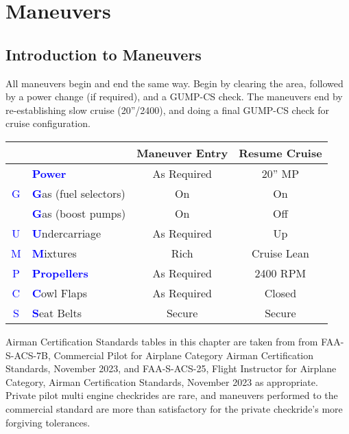 
\chapter{Maneuvers}

\section{Introduction to Maneuvers}

All maneuvers begin and end the same way. Begin by clearing the area, followed by a power change (if required),
and a GUMP-CS check. The maneuvers end by re-establishing slow cruise (20''/2400), and doing a final GUMP-CS
check for cruise configuration.

\begin{table}[H]
\centering
\begin{tabular}{|c|l|c|c|}
\hline
                    &                                                 & \textbf{Maneuver Entry} & \textbf{Resume Cruise} \\ \hline
                    & \textcolor{blue}{\textbf{Power}}                & As Required             & 20'' MP                \\ \hline
\textcolor{blue}{G} & \textcolor{blue}{\textbf{G}}as (fuel selectors) & On                      & On                     \\
                    & \textcolor{blue}{\textbf{G}}as (boost pumps)    & On                      & Off                    \\ \hline
\textcolor{blue}{U} & \textcolor{blue}{\textbf{U}}ndercarriage        & As Required             & Up                     \\ \hline
\textcolor{blue}{M} & \textcolor{blue}{\textbf{M}}ixtures             & Rich                    & Cruise Lean            \\ \hline
\textcolor{blue}{P} & \textcolor{blue}{\textbf{Propellers}}           & As Required             & 2400 RPM               \\ \hline
\textcolor{blue}{C} & \textcolor{blue}{\textbf{C}}owl Flaps           & As Required             & Closed                 \\ \hline
\textcolor{blue}{S} & \textcolor{blue}{\textbf{S}}eat Belts           & Secure                  & Secure                 \\ \hline
\end{tabular}
\end{table}

Airman Certification Standards tables in this chapter are taken from from FAA-S-ACS-7B, Commercial Pilot for Airplane Category Airman Certification Standards, November 2023, and  FAA-S-ACS-25, Flight Instructor for Airplane Category, Airman Certification Standards, November 2023 as appropriate. Private pilot multi engine checkrides are rare, and maneuvers performed to the commercial standard are more than satisfactory for the private checkride's more forgiving tolerances.

